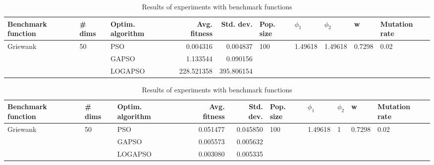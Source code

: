 \documentclass{article}
\begin{document}
\begin{table}
\centering
\caption{Results of experiments with benchmark functions}
\begin{tabular}{lllrrlllll}
\toprule
       Benchmark function &             \# dims & Optim. algorithm &  Avg. fitness &  Std. dev. &            Pop. size &               $\phi_{1}$ &               $\phi_{2}$ &                       w &         Mutation rate \\
\midrule
\multirow{3}{*}{Griewank} & \multirow{3}{*}{50} &              PSO &      0.004316 &   0.004837 & \multirow{3}{*}{100} & \multirow{3}{*}{1.49618} & \multirow{3}{*}{1.49618} & \multirow{3}{*}{0.7298} & \multirow{3}{*}{0.02} \\
                          &                     &            GAPSO &      1.133544 &   0.090156 &                      &                          &                          &                         &                       \\
                          &                     &          LOGAPSO &    228.521358 & 395.806154 &                      &                          &                          &                         &                       \\
\bottomrule
\end{tabular}
\end{table}
\begin{table}
\centering
\caption{Results of experiments with benchmark functions}
\begin{tabular}{lllrrlllll}
\toprule
       Benchmark function &             \# dims & Optim. algorithm &  Avg. fitness &  Std. dev. &            Pop. size &               $\phi_{1}$ &         $\phi_{2}$ &                       w &         Mutation rate \\
\midrule
\multirow{3}{*}{Griewank} & \multirow{3}{*}{50} &              PSO &      0.051477 &   0.045850 & \multirow{3}{*}{100} & \multirow{3}{*}{1.49618} & \multirow{3}{*}{1} & \multirow{3}{*}{0.7298} & \multirow{3}{*}{0.02} \\
                          &                     &            GAPSO &      0.005573 &   0.005632 &                      &                          &                    &                         &                       \\
                          &                     &          LOGAPSO &      0.003080 &   0.005335 &                      &                          &                    &                         &                       \\
\bottomrule
\end{tabular}
\end{table}
\end{document}
